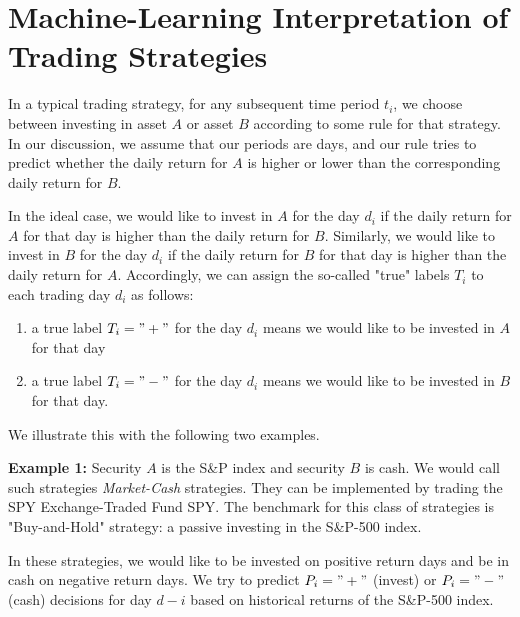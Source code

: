 \documentclass{article}
\begin{document}
\section{Machine-Learning Interpretation of \\ Trading Strategies}
\label{section_ml_interpretation}


In a typical trading strategy, for any subsequent time period $t_{i}$, we choose between investing in asset $A$ or asset $B$ according to some rule for that strategy. In our discussion, we assume that our periods are days, and our rule tries to predict whether the daily return for $A$ is higher or lower than the corresponding daily return for $B$. 

In the ideal case, we would like to invest in $A$ for the day $d_{i}$ if the daily return for $A$ for that day is higher than the daily return for $B$. Similarly, we would like to invest in $B$ for the day $d_{i}$ if the daily return for $B$ for that day is higher than the daily return for $A$.
Accordingly, we can assign the so-called "true" labels $T_{i}$ to each trading day $d_{i}$ as follows:
\medskip
\begin{enumerate}[nosep]
\item a true label $T_{i}="+"$ for the day $d_{i}$ means we would like to be invested in $A$ for that day
\item a true label $T_{i}="-"$ for the day $d_{i}$ means we would like to be invested in $B$ for
that day.
\end{enumerate}

We illustrate this with the following two examples.

\medskip
\noindent
{\bf Example 1: } Security $A$ is the S{\&}P index and security $B$ is cash. 
We would call such strategies {\it Market-Cash} strategies. They can be implemented by trading the SPY Exchange-Traded 
Fund SPY.  The benchmark for this class of strategies is 
    "Buy-and-Hold" strategy: a passive investing in the S{\&}P-500 index.

In these strategies, we would like to be invested on positive return days and be in cash on negative return days. We try to predict $P_{i}="+"$ (invest) or
$P_{i}="-"$ (cash) decisions for day $d-{i}$ based on historical returns of the S{\&}P-500 index.
\end{document}
